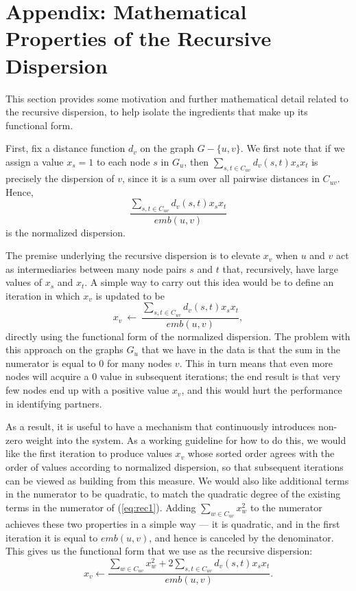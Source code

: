 \documentclass{sigchi}
\newcommand{\omt}[1]{}
\begin{document}
\section{Appendix: Mathematical Properties of the Recursive Dispersion}
\label{sec:rec-disp}

\omt{
$$x_v \longleftarrow 
  \frac{    \sum_{w \in C_{uv}} x_w^2 
        + 2 \sum_{s, t \in C_{uv}} d_v(s,t) x_s x_t}
       {emb(u,v)}.$$
}

This section provides some motivation and further mathematical detail 
related to the recursive dispersion, to help isolate the
ingredients that make up its functional form.

First, fix a distance function $d_v$ on the graph $G - \{u, v\}$.
We first note that if we assign a value $x_s = 1$ to each node $s$
in $G_u$, then $\sum_{s, t \in C_{uv}} d_v(s,t) x_s x_t$ is precisely
the dispersion of $v$, since it is a sum over all pairwise distances in 
$C_{uv}$. Hence, 
$$\frac{\sum_{s, t \in C_{uv}} d_v(s,t) x_s x_t}{emb(u,v)}$$
is the normalized dispersion.

The premise underlying the recursive dispersion is to elevate $x_v$
when $u$ and $v$ act as 
intermediaries between many node pairs $s$ and $t$
that, recursively, have large values of $x_s$ and $x_t$.
A simple way to carry out this idea would be to define an iteration
in which $x_v$ is updated to be 
\begin{equation}
x_v ~ \longleftarrow ~ 
   \frac{\sum_{s, t \in C_{uv}} d_v(s,t) x_s x_t}{emb(u,v)},
\label{eq:rec1}
\end{equation}
directly using the functional form of the normalized dispersion.
The problem with this approach on the graphs $G_u$ that we have
in the data is that the sum in the numerator is equal to $0$ for 
many nodes $v$.  This in turn means that even more nodes will acquire a
$0$ value in subsequent iterations; the end result is
that very few nodes end up with a positive value $x_v$, and
this would hurt the performance in identifying partners.

As a result, it is useful to have a mechanism that continuously
introduces non-zero weight into the system.
As a working guideline for how to do this,
we would like the first iteration to produce values $x_v$
whose sorted order agrees with the order of values according
to normalized dispersion, so that
subsequent iterations can be viewed as building from this measure.
We would also like additional terms in the numerator to 
be quadratic, to match the quadratic degree of the existing terms
in the numerator of (\ref{eq:rec1}).
Adding $\sum_{w \in C_{uv}} x_w^2$ to the numerator achieves
these two properties in a simple way --- it is quadratic, and
in the first iteration it is equal to $emb(u,v)$, and hence
is canceled by the denominator.
This gives us 
the functional form that we use as the recursive dispersion:
\begin{equation}
x_v \longleftarrow 
  \frac{    \sum_{w \in C_{uv}} x_w^2 
        + 2 \sum_{s, t \in C_{uv}} d_v(s,t) x_s x_t}
       {emb(u,v)}.
\label{eq:rec2}
\end{equation}
\end{document}
